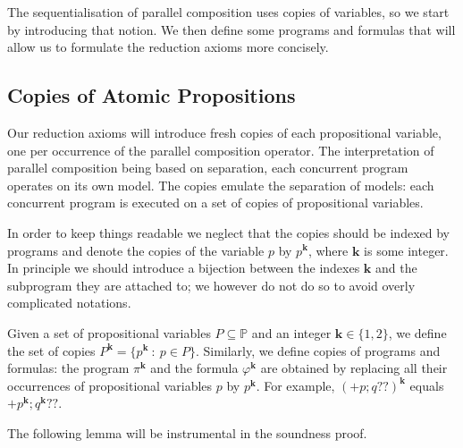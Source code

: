 \documentclass{llncs}
\newcommand{\cp}[2]{{#2}^\mathbf{#1}}
\newcommand{\pll}{ {||} }							%
\newcommand{\testendo}{?\!\!?}			%
\newcommand{\assgntopV}[1]{{\mathtt {+} #1}}
\renewcommand{\phi}{\varphi}
\newcommand{\propset}{\mathbb P}
\newcommand{\set}[1]{\{#1\}}
\newcommand{\suchthat}{~ : ~}
\begin{document}
The sequentialisation of parallel composition uses copies of variables, so we start by introducing that notion. 
We then define some programs and formulas 
that will allow us to formulate the reduction axioms more concisely. 

\subsection{Copies of Atomic Propositions}\label{sec:copyVars}

Our reduction axioms will introduce fresh copies of each propositional variable, one per occurrence of the parallel composition operator. 
The interpretation of parallel composition being based on separation, each concurrent program operates on its own model.
The copies emulate the separation of models: each concurrent program is executed on a set of copies of propositional variables.

In order to keep things readable we neglect that the copies should be indexed by programs
and denote the copies of the variable $p$ by $\cp k p$, where $\mathbf{k}$ is some integer. 
In principle we should introduce a bijection between the indexes $\mathbf{k}$ and the subprogram they are attached to;
we however do not do so to avoid overly complicated notations.

Given a set of propositional variables $P \subseteq \propset$ and an integer $\mathbf{k} \in \set{1,2}$, we define the set of copies
$\cp{k} P = \{ \cp{k} p \suchthat p \in P\}$. 
Similarly, we define copies of programs and formulas:
the program $\cp{k} \pi$ and the formula $\cp{k} \phi$ are obtained by replacing all their occurrences of
propositional variables $p$ by $\cp k p$. 
For example, $\cp{k} {(\assgntopV p ; q \testendo )}$ equals 
$ \assgntopV{ \cp{k} p } ; \cp{k} q \testendo $.

The following lemma will be instrumental in the soundness proof. 
\end{document}

